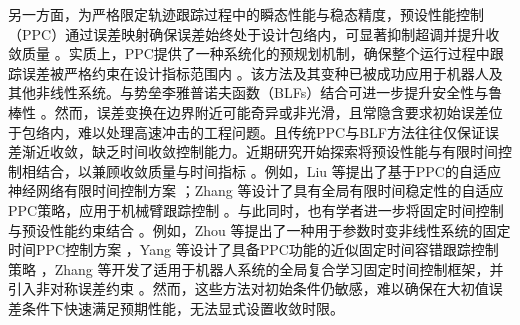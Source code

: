 \documentclass[pdflatex,sn-mathphys-num]{sn-jnl}%
\theoremstyle{thmstyleone}%
\theoremstyle{thmstyletwo}%
\theoremstyle{thmstylethree}%
\begin{document}
另一方面，为严格限定轨迹跟踪过程中的瞬态性能与稳态精度，预设性能控制（PPC）通过误差映射确保误差始终处于设计包络内，可显著抑制超调并提升收敛质量 \cite{BechlioulisRovithakis_2008_Prescribedperformance,Bu_2023_Prescribedperformance}。实质上，PPC提供了一种系统化的预规划机制，确保整个运行过程中跟踪误差被严格约束在设计指标范围内 \cite{ZhangEtAl_2024_Prescribedperformance,ZhangEtAl_2024_Lowcomplexityprescribed,ZhangChai_2023_Globalprescribed}。该方法及其变种已被成功应用于机器人及其他非线性系统\cite{LiuEtAl_2023_Reducedorderobserverbased,XieEtAl_2024_Lowcomplexitytracking,DimanidisEtAl_2020_Outputfeedback}。与势垒李雅普诺夫函数（BLFs）结合可进一步提升安全性与鲁棒性 \cite{WangEtAl_2024_Prescribedperformance,ZhangEtAl_2024_Prescribedperformance,XieEtAl_2024_Lowcomplexitytracking,DimanidisEtAl_2020_Outputfeedback}。然而，误差变换在边界附近可能奇异或非光滑，且常隐含要求初始误差位于包络内，难以处理高速冲击的工程问题。且传统PPC与BLF方法往往仅保证误差渐近收敛，缺乏时间收敛控制能力。近期研究开始探索将预设性能与有限时间控制相结合，以兼顾收敛质量与时间指标 \cite{LiuEtAl_2018_Adaptiveneural,SuiEtAl_2022_Finitetimeadaptive,SunEtAl_2022_Fuzzyadaptive,SongZhou_2018_NeuroadaptiveControl,GaoEtAl_2023_Finitetimefaulttolerant}。例如，Liu 等提出了基于PPC的自适应神经网络有限时间控制方案 \cite{LiuEtAl_2018_Adaptiveneural}；Zhang 等设计了具有全局有限时间稳定性的自适应PPC策略，应用于机械臂跟踪控制 \cite{ZhangEtAl_2024_noveldisturbance}。与此同时，也有学者进一步将固定时间控制与预设性能约束结合 \cite{LiEtAl_2023_Distributedfixedtime,ZhuEtAl_2023_Fixedtimefuzzy,SunEtAl_2024_Fixedtimeprescribed,YangEtAl_2023_Proximatefixedtime,ZhangEtAl_2023_Globalcomposite}。例如，Zhou 等提出了一种用于参数时变非线性系统的固定时间PPC控制方案 \cite{SunEtAl_2024_Fixedtimeprescribed}，Yang 等设计了具备PPC功能的近似固定时间容错跟踪控制策略 \cite{YangEtAl_2023_Proximatefixedtime,YangSu_2022_Proximatefixedtime}，Zhang 等开发了适用于机器人系统的全局复合学习固定时间控制框架，并引入非对称误差约束 \cite{ZhangEtAl_2023_Globalcomposite}。然而，这些方法对初始条件仍敏感，难以确保在大初值误差条件下快速满足预期性能，无法显式设置收敛时限。
\end{document}
